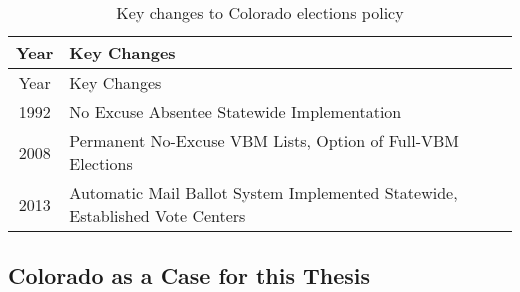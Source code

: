 \documentclass[12pt,twoside]{reedthesis}
\begin{document}
  \begin{longtable}[]{@{}cl@{}}
  \caption{Key changes to Colorado elections policy
  \label{tab:elect_policy}}\tabularnewline
  \toprule
  \begin{minipage}[b]{0.07\columnwidth}\centering\strut
  Year\strut
  \end{minipage} & \begin{minipage}[b]{0.87\columnwidth}\raggedright\strut
  Key Changes\strut
  \end{minipage}\tabularnewline
  \midrule
  \endfirsthead
  \toprule
  \begin{minipage}[b]{0.07\columnwidth}\centering\strut
  Year\strut
  \end{minipage} & \begin{minipage}[b]{0.87\columnwidth}\raggedright\strut
  Key Changes\strut
  \end{minipage}\tabularnewline
  \midrule
  \endhead
  \begin{minipage}[t]{0.07\columnwidth}\centering\strut
  1992\strut
  \end{minipage} & \begin{minipage}[t]{0.87\columnwidth}\raggedright\strut
  No Excuse Absentee Statewide Implementation\strut
  \end{minipage}\tabularnewline
  \begin{minipage}[t]{0.07\columnwidth}\centering\strut
  2008\strut
  \end{minipage} & \begin{minipage}[t]{0.87\columnwidth}\raggedright\strut
  Permanent No-Excuse VBM Lists, Option of Full-VBM Elections\strut
  \end{minipage}\tabularnewline
  \begin{minipage}[t]{0.07\columnwidth}\centering\strut
  2013\strut
  \end{minipage} & \begin{minipage}[t]{0.87\columnwidth}\raggedright\strut
  Automatic Mail Ballot System Implemented Statewide, Established Vote
  Centers\strut
  \end{minipage}\tabularnewline
  \bottomrule
  \end{longtable}
  
  \clearpage
  
  \subsection{Colorado as a Case for this
  Thesis}\label{colorado-as-a-case-for-this-thesis}
  
\end{document}
